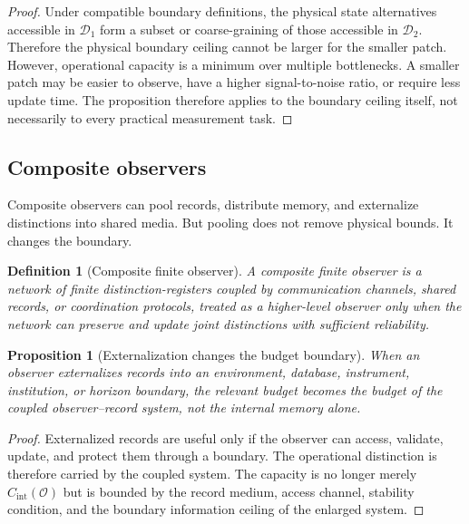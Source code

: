 \documentclass[10pt,a4paper,twocolumn,aps,prl]{revtex4-2}
\newtheorem{definition}{Definition}
\newtheorem{proposition}{Proposition}
\newcommand{\Obs}{\mathcal{O}}
\newcommand{\Patch}{\mathcal{D}}
\begin{document}
\begin{proof}
Under compatible boundary definitions, the physical state alternatives accessible in $\Patch_1$ form a subset or coarse-graining of those accessible in $\Patch_2$. Therefore the physical boundary ceiling cannot be larger for the smaller patch. However, operational capacity is a minimum over multiple bottlenecks. A smaller patch may be easier to observe, have a higher signal-to-noise ratio, or require less update time. The proposition therefore applies to the boundary ceiling itself, not necessarily to every practical measurement task.
\end{proof}

\subsection{Composite observers}

Composite observers can pool records, distribute memory, and externalize distinctions into shared media. But pooling does not remove physical bounds. It changes the boundary.

\begin{definition}[Composite finite observer]
A composite finite observer is a network of finite distinction-registers coupled by communication channels, shared records, or coordination protocols, treated as a higher-level observer only when the network can preserve and update joint distinctions with sufficient reliability.
\end{definition}

\begin{proposition}[Externalization changes the budget boundary]
When an observer externalizes records into an environment, database, instrument, institution, or horizon boundary, the relevant budget becomes the budget of the coupled observer--record system, not the internal memory alone.
\end{proposition}

\begin{proof}
Externalized records are useful only if the observer can access, validate, update, and protect them through a boundary. The operational distinction is therefore carried by the coupled system. The capacity is no longer merely $C_{\mathrm{int}}(\Obs)$ but is bounded by the record medium, access channel, stability condition, and the boundary information ceiling of the enlarged system.
\end{proof}

\end{document}

